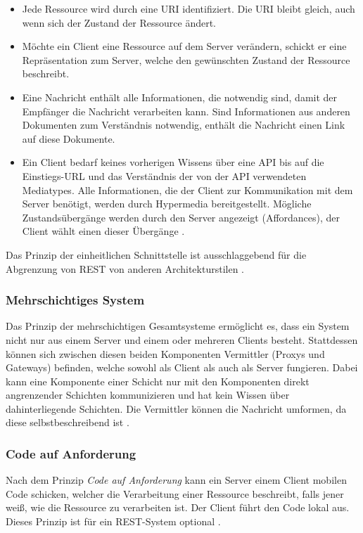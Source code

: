 \begin{itemize}
    \item {} Jede Ressource wird durch eine URI identifiziert. Die URI bleibt gleich, auch wenn sich der Zustand der Ressource ändert.
    \item {} Möchte ein Client eine Ressource auf dem Server verändern, schickt er eine Repräsentation zum Server, welche den gewünschten Zustand der Ressource beschreibt.
    \item {} Eine Nachricht enthält alle Informationen, die notwendig sind, damit der Empfänger die Nachricht verarbeiten kann. Sind Informationen aus anderen Dokumenten zum Verständnis notwendig, enthält die Nachricht einen Link auf diese Dokumente.
    \item {} Ein Client bedarf keines vorherigen Wissens über eine API bis auf die Einstiegs-URL und das Verständnis der von der API verwendeten Mediatypes. Alle Informationen, die der Client zur Kommunikation mit dem Server benötigt, werden durch Hypermedia bereitgestellt. Mögliche Zustandsübergänge werden durch den Server angezeigt (Affordances), der Client wählt einen dieser Übergänge \autocites{Fielding2008}[S.~345ff.]{Richardson2013}.
\end{itemize}
Das Prinzip der einheitlichen Schnittstelle ist ausschlaggebend für die Abgrenzung von REST von anderen Architekturstilen \autocite[Abb.~5-9]{Fielding2000}.

\subsubsection{Mehrschichtiges System}
Das Prinzip der mehrschichtigen Gesamtsysteme ermöglicht es, dass ein System nicht nur aus einem Server und einem oder mehreren Clients besteht. Stattdessen können sich zwischen diesen beiden Komponenten Vermittler (Proxys und Gateways) befinden, welche sowohl als Client als auch als Server fungieren. Dabei kann eine Komponente einer Schicht nur mit den Komponenten direkt angrenzender Schichten kommunizieren und hat kein Wissen über dahinterliegende Schichten. Die Vermittler können die Nachricht umformen, da diese selbstbeschreibend ist \autocite[S.~46f., 82ff.]{Fielding2000}.

\subsubsection{Code auf Anforderung}
Nach dem Prinzip \emph{Code auf Anforderung} kann ein Server einem Client mobilen Code schicken, welcher die Verarbeitung einer Ressource beschreibt, falls jener weiß, wie die Ressource zu verarbeiten ist. Der Client führt den Code lokal aus. Dieses Prinzip ist für ein REST-System optional \autocite[S.~53, 84]{Fielding2000}.

